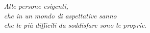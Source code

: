 \cleardoublepage
\thispagestyle{empty}

\vspace*{8cm}

\begin{flushright}
\emph{
Alle persone esigenti,\\
che in un mondo di aspettative sanno\\
che le più difficili da soddisfare sono le proprie.
}
\end{flushright}

\cleardoublepage
